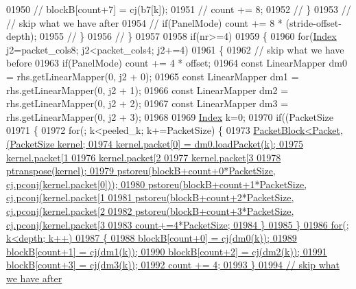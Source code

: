 \begin{DoxyCode}
01950 \textcolor{comment}{//         blockB[count+7] = cj(b7[k]);}
01951 \textcolor{comment}{//         count += 8;}
01952 \textcolor{comment}{//       \}}
01953 \textcolor{comment}{//       // skip what we have after}
01954 \textcolor{comment}{//       if(PanelMode) count += 8 * (stride-offset-depth);}
01955 \textcolor{comment}{//     \}}
01956 \textcolor{comment}{//   \}}
01957 
01958   \textcolor{keywordflow}{if}(nr>=4)
01959   \{
01960     \textcolor{keywordflow}{for}(\hyperlink{namespace_eigen_a62e77e0933482dafde8fe197d9a2cfde}{Index} j2=packet\_cols8; j2<packet\_cols4; j2+=4)
01961     \{
01962       \textcolor{comment}{// skip what we have before}
01963       \textcolor{keywordflow}{if}(PanelMode) count += 4 * offset;
01964       \textcolor{keyword}{const} LinearMapper dm0 = rhs.getLinearMapper(0, j2 + 0);
01965       \textcolor{keyword}{const} LinearMapper dm1 = rhs.getLinearMapper(0, j2 + 1);
01966       \textcolor{keyword}{const} LinearMapper dm2 = rhs.getLinearMapper(0, j2 + 2);
01967       \textcolor{keyword}{const} LinearMapper dm3 = rhs.getLinearMapper(0, j2 + 3);
01968 
01969       \hyperlink{namespace_eigen_a62e77e0933482dafde8fe197d9a2cfde}{Index} k=0;
01970       \textcolor{keywordflow}{if}((PacketSize%
01971       \{
01972         \textcolor{keywordflow}{for}(; k<peeled\_k; k+=PacketSize) \{
01973           \hyperlink{struct_eigen_1_1internal_1_1_packet_block}{PacketBlock<Packet,(PacketSize%
       kernel;
01974           kernel.packet[0] = dm0.loadPacket(k);
01975           kernel.packet[1%
01976           kernel.packet[2%
01977           kernel.packet[3%
01978           ptranspose(kernel);
01979           pstoreu(blockB+count+0*PacketSize, cj.pconj(kernel.packet[0]));
01980           pstoreu(blockB+count+1*PacketSize, cj.pconj(kernel.packet[1%
01981           pstoreu(blockB+count+2*PacketSize, cj.pconj(kernel.packet[2%
01982           pstoreu(blockB+count+3*PacketSize, cj.pconj(kernel.packet[3%
01983           count+=4*PacketSize;
01984         \}
01985       \}
01986       \textcolor{keywordflow}{for}(; k<depth; k++)
01987       \{
01988         blockB[count+0] = cj(dm0(k));
01989         blockB[count+1] = cj(dm1(k));
01990         blockB[count+2] = cj(dm2(k));
01991         blockB[count+3] = cj(dm3(k));
01992         count += 4;
01993       \}
01994       \textcolor{comment}{// skip what we have after}
}
\end{DoxyCode}
